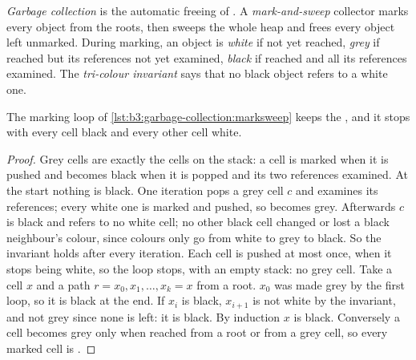 \begin{definition}\label{def:b3:garbage-collection:marksweep}
\emph{Garbage collection} is the automatic freeing of . A \emph{mark-and-sweep} collector marks every object  from the roots, then sweeps the whole heap and frees every object left unmarked. During marking, an object is \emph{white} if not yet reached, \emph{grey} if reached but its references not yet examined, \emph{black} if reached and all its references examined. The \emph{tri-colour invariant} says that no black object refers to a white one.
\end{definition}

\label{lst:b3:garbage-collection:marksweep}

\begin{theorem}\label{thm:b3:garbage-collection:tricolour}
The marking loop of \cref{lst:b3:garbage-collection:marksweep} keeps the , and it stops with every  cell black and every other cell white.
\end{theorem}

\begin{proof}
Grey cells are exactly the cells on the stack: a cell is marked when it is pushed and becomes black when it is popped and its two references examined. At the start nothing is black. One iteration pops a grey cell $c$ and examines its references; every white one is marked and pushed, so becomes grey. Afterwards $c$ is black and refers to no white cell; no other black cell changed or lost a black neighbour's colour, since colours only go from white to grey to black. So the invariant holds after every iteration. Each cell is pushed at most once, when it stops being white, so the loop stops, with an empty stack: no grey cell. Take a  cell $x$ and a path $r = x_0, x_1, \dots, x_k = x$ from a root. $x_0$ was made grey by the first loop, so it is black at the end. If $x_i$ is black, $x_{i+1}$ is not white by the invariant, and not grey since none is left: it is black. By induction $x$ is black. Conversely a cell becomes grey only when reached from a root or from a grey cell, so every marked cell is .
\end{proof}

